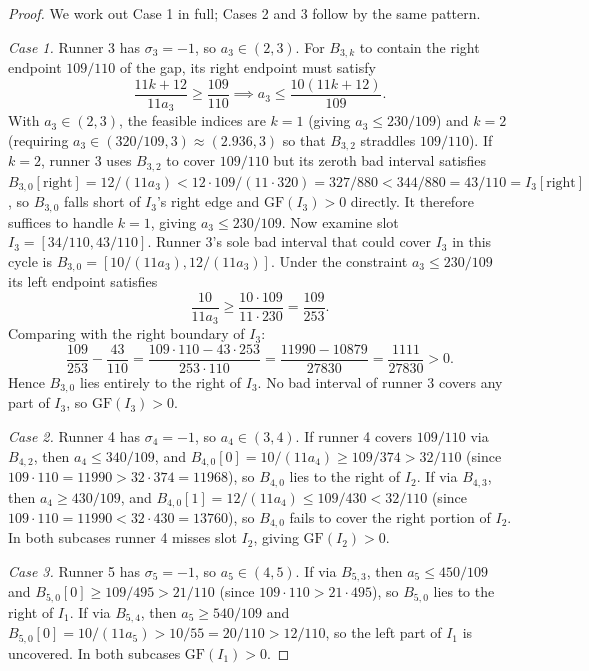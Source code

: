 \documentclass[12pt]{article}
\begin{document}
\begin{proof}
We work out Case 1 in full; Cases 2 and 3 follow by the same pattern.

\emph{Case 1.} Runner 3 has $\sigma_3=-1$, so $a_3\in(2,3)$. For $B_{3,k}$ to contain
the right endpoint $109/110$ of the gap, its right endpoint must satisfy
\[
\frac{11k+12}{11a_3} \ge \frac{109}{110} \implies a_3 \le \frac{10(11k+12)}{109}.
\]
With $a_3\in(2,3)$, the feasible indices are $k=1$ (giving $a_3\le 230/109$) and $k=2$
(requiring $a_3\in(320/109,3)\approx(2.936,3)$ so that $B_{3,2}$ straddles $109/110$).
If $k=2$, runner 3 uses $B_{3,2}$ to cover $109/110$ but its zeroth bad interval satisfies
$B_{3,0}[\text{right}]=12/(11a_3)<12\cdot 109/(11\cdot 320)=327/880<344/880=43/110=I_3[\text{right}]$,
so $B_{3,0}$ falls short of $I_3$'s right edge and $\mathrm{GF}(I_3)>0$ directly.
It therefore suffices to handle $k=1$, giving $a_3\le 230/109$.
Now examine slot $I_3=[34/110,43/110]$. Runner 3's sole bad interval that could cover
$I_3$ in this cycle is $B_{3,0}=[10/(11a_3),12/(11a_3)]$. Under the constraint
$a_3\le 230/109$ its left endpoint satisfies
\[
\frac{10}{11a_3} \ge \frac{10\cdot 109}{11\cdot 230} = \frac{109}{253}.
\]
Comparing with the right boundary of $I_3$:
\[
\frac{109}{253} - \frac{43}{110}
  = \frac{109\cdot 110 - 43\cdot 253}{253\cdot 110}
  = \frac{11990-10879}{27830}
  = \frac{1111}{27830} > 0.
\]
Hence $B_{3,0}$ lies entirely to the right of $I_3$. No bad interval of runner 3 covers
any part of $I_3$, so $\mathrm{GF}(I_3)>0$.

\emph{Case 2.} Runner 4 has $\sigma_4=-1$, so $a_4\in(3,4)$. If runner 4 covers $109/110$
via $B_{4,2}$, then $a_4\le 340/109$, and $B_{4,0}[0]=10/(11a_4)\ge 109/374>32/110$
(since $109\cdot 110=11990>32\cdot 374=11968$), so $B_{4,0}$ lies to the right of $I_2$.
If via $B_{4,3}$, then $a_4\ge 430/109$, and $B_{4,0}[1]=12/(11a_4)\le 109/430<32/110$
(since $109\cdot 110=11990<32\cdot 430=13760$), so $B_{4,0}$ fails to cover the right
portion of $I_2$.
In both subcases runner 4 misses slot $I_2$, giving $\mathrm{GF}(I_2)>0$.

\emph{Case 3.} Runner 5 has $\sigma_5=-1$, so $a_5\in(4,5)$. If via $B_{5,3}$, then
$a_5\le 450/109$ and $B_{5,0}[0]\ge 109/495>21/110$ (since $109\cdot 110>21\cdot 495$),
so $B_{5,0}$ lies to the right of $I_1$. If via $B_{5,4}$, then $a_5\ge 540/109$ and
$B_{5,0}[0]=10/(11a_5)>10/55=20/110>12/110$, so the left part of $I_1$ is uncovered.
In both subcases $\mathrm{GF}(I_1)>0$.
\end{proof}
\end{document}
